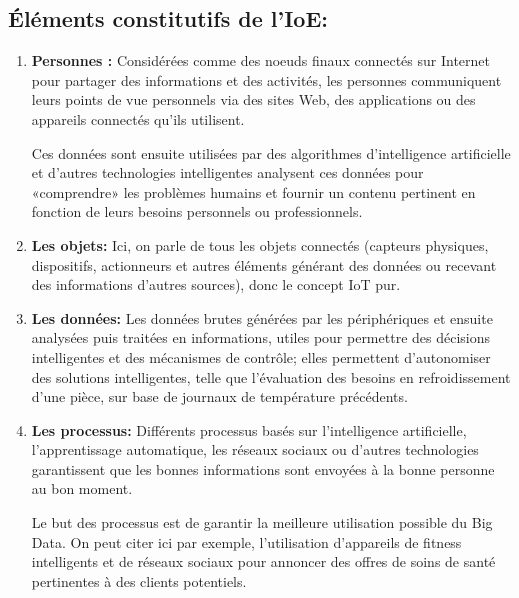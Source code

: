\subsection{Éléments constitutifs de l’IoE:}
\begin{enumerate}
\item \textbf{Personnes :} Considérées comme des noeuds finaux connectés sur Internet pour partager des informations et des activités, les personnes communiquent leurs points de vue personnels via des sites Web, des applications ou des appareils connectés qu’ils utilisent.

Ces données sont ensuite utilisées par des algorithmes d’intelligence artificielle et d’autres technologies intelligentes analysent ces données pour «comprendre» les problèmes humains et fournir un contenu pertinent en fonction de leurs besoins personnels ou professionnels.

\item \textbf{Les objets:} Ici, on parle de tous les objets connectés (capteurs physiques, dispositifs, actionneurs et autres éléments générant des données ou recevant des informations d’autres sources), donc le concept IoT pur.
\item \textbf{Les données:} Les données brutes générées par les périphériques et ensuite analysées puis traitées en informations, utiles pour permettre des décisions intelligentes et des mécanismes de contrôle; elles permettent d’autonomiser des solutions intelligentes, telle que l’évaluation des besoins en refroidissement d’une pièce, sur base de journaux de température précédents.
\item \textbf{Les processus:} Différents processus basés sur l’intelligence artificielle, l’apprentissage automatique, les réseaux sociaux ou d’autres technologies garantissent que les bonnes informations sont envoyées à la bonne personne au bon moment.

Le but des processus est de garantir la meilleure utilisation possible du Big Data. On peut citer ici par exemple, l’utilisation d’appareils de fitness intelligents et de réseaux sociaux pour annoncer des offres de soins de santé pertinentes à des clients potentiels.
\end{enumerate}

